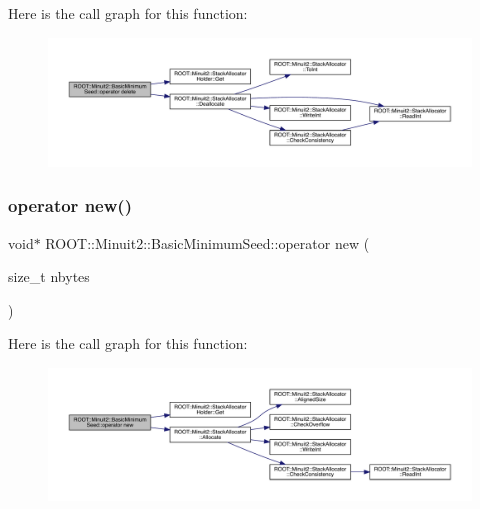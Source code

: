 Here is the call graph for this function\+:
\nopagebreak
\begin{figure}[H]
\begin{center}
\leavevmode
\includegraphics[width=350pt]{de/d50/classROOT_1_1Minuit2_1_1BasicMinimumSeed_ae2af98f9f03cfe5e5202153b914ff120_cgraph}
\end{center}
\end{figure}
\mbox{\label{classROOT_1_1Minuit2_1_1BasicMinimumSeed_ae9ee17ec0140aa209e488b064675f3c3}} 
\subsubsection{\texorpdfstring{operator new()}{operator new()}\hspace{0.1cm}{\footnotesize\ttfamily [1/3]}}
{\footnotesize\ttfamily void$\ast$ R\+O\+O\+T\+::\+Minuit2\+::\+Basic\+Minimum\+Seed\+::operator new (\begin{DoxyParamCaption}\item[{size\+\_\+t}]{nbytes }\end{DoxyParamCaption})\hspace{0.3cm}{\ttfamily [inline]}}

Here is the call graph for this function\+:
\nopagebreak
\begin{figure}[H]
\begin{center}
\leavevmode
\includegraphics[width=350pt]{de/d50/classROOT_1_1Minuit2_1_1BasicMinimumSeed_ae9ee17ec0140aa209e488b064675f3c3_cgraph}
\end{center}
\end{figure}
\mbox{\label{classROOT_1_1Minuit2_1_1BasicMinimumSeed_ae9ee17ec0140aa209e488b064675f3c3}} 
